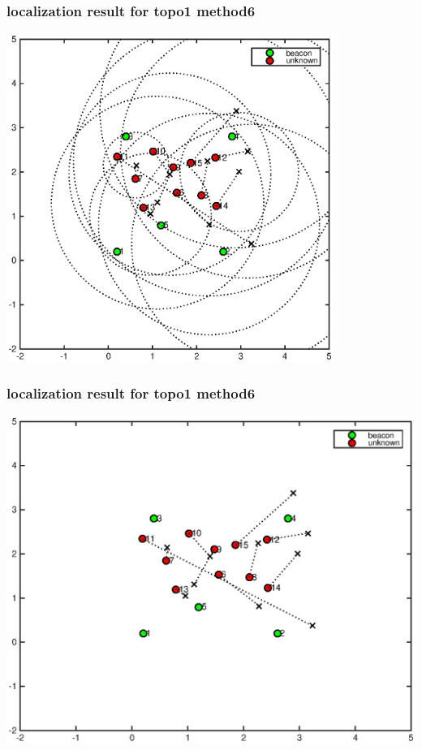 \documentclass[11pt]{beamer}
\begin{document}
\begin{frame}
 \frametitle{localization result for topo1 method6}
\includegraphics[width=0.8\textwidth]{final_mean_std_result_topo1_method6.eps} 
\end{frame}

\begin{frame}
 \frametitle{localization result for topo1 method6}
\includegraphics[width=\textwidth]{final_mean_result_topo1_method6.eps} 
\end{frame}
\end{document}
